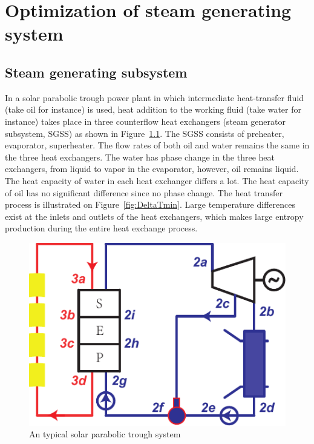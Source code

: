 \chapter{Optimization of steam generating system}
\label{cha:osgs}
\section{Steam generating subsystem}

In a solar parabolic trough power plant in which intermediate heat-transfer fluid (take oil for instance) is used, heat addition to the working fluid (take water for instance) takes place in three counterflow heat exchangers (steam generator subsystem, SGSS) as shown in Figure~\ref{fig:PTC}. The SGSS consists of preheater, evaporator, superheater. The flow rates of both oil and water remains the same in the three heat exchangers. 
The water has phase change in the three heat exchangers, from liquid to vapor in the evaporator, however, oil remains liquid. The heat capacity of water in each heat exchanger differs a lot. The heat capacity of oil has no significant difference since no phase change. The heat transfer process is illustrated on Figure~\ref{fig:DeltaTmin}. Large temperature differences exist at the inlets and outlets of the heat exchangers, which makes large entropy production during the entire heat exchange process.


\noindent \begin{figure}[htbp]
\begin{center}
	\includegraphics[width = 0.7\columnwidth]{fig/PTC}
	\caption{An typical solar parabolic trough system}
	\label{fig:PTC}
\end{center}
\end{figure}

